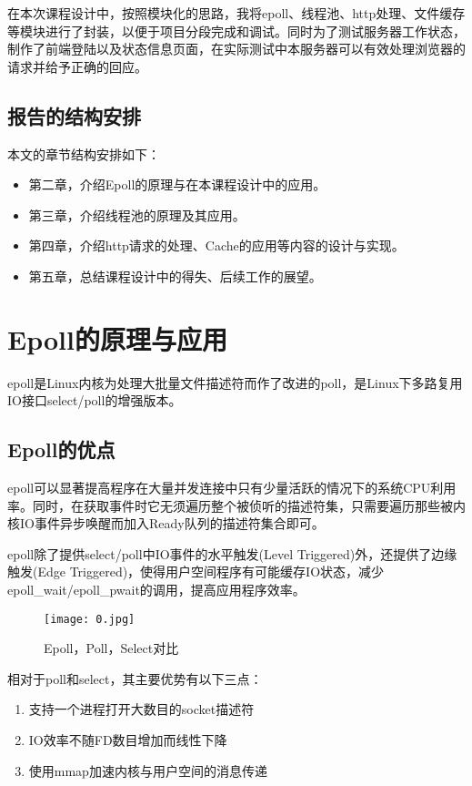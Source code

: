 \documentclass[bachelor]{thesis-uestc}
\begin{document}
在本次课程设计中，按照模块化的思路，我将epoll、线程池、http处理、文件缓存等模块进行了封装，以便于项目分段完成和调试。同时为了测试服务器工作状态，制作了前端登陆以及状态信息页面，在实际测试中本服务器可以有效处理浏览器的请求并给予正确的回应。

\section{报告的结构安排}
本文的章节结构安排如下：

\begin{itemize}
	\item 第二章，介绍Epoll的原理与在本课程设计中的应用。
	\item 第三章，介绍线程池的原理及其应用。
	\item 第四章，介绍http请求的处理、Cache的应用等内容的设计与实现。
	\item 第五章，总结课程设计中的得失、后续工作的展望。
\end{itemize}

\chapter{Epoll的原理与应用}

epoll是Linux内核为处理大批量文件描述符而作了改进的poll，是Linux下多路复用IO接口select/poll的增强版本。

\section{Epoll的优点}
epoll可以显著提高程序在大量并发连接中只有少量活跃的情况下的系统CPU利用率。同时，在获取事件时它无须遍历整个被侦听的描述符集，只需要遍历那些被内核IO事件异步唤醒而加入Ready队列的描述符集合即可。

epoll除了提供select/poll中IO事件的水平触发(Level Triggered)外，还提供了边缘触发(Edge Triggered)，使得用户空间程序有可能缓存IO状态，减少epoll\_wait/epoll\_pwait的调用，提高应用程序效率。

\begin{figure}[h]
\texttt{[image: 0.jpg]}
\caption{Epoll，Poll，Select对比}
\label{0} 
\end{figure}

相对于poll和select，其主要优势有以下三点：
\begin{enumerate}
	\item 支持一个进程打开大数目的socket描述符
	\item IO效率不随FD数目增加而线性下降
	\item 使用mmap加速内核与用户空间的消息传递
\end{enumerate}
\end{document}
